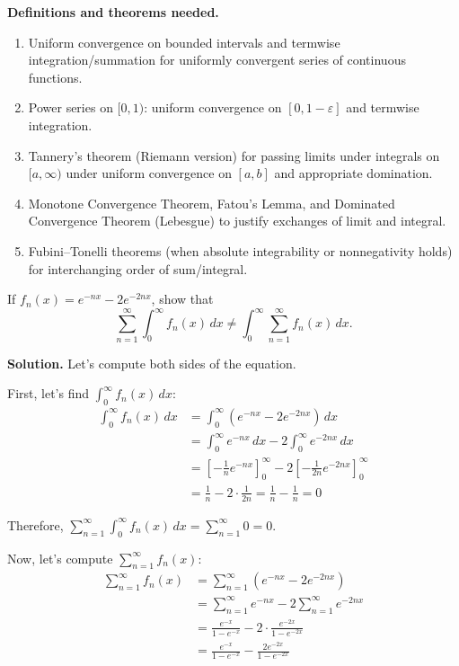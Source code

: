 \noindent\textbf{Definitions and theorems needed.}
\begin{enumerate}[label=(\alph*)]
    \item Uniform convergence on bounded intervals and termwise integration/summation for uniformly convergent series of continuous functions.
    \item Power series on $[0,1)$: uniform convergence on $[0,1-\varepsilon]$ and termwise integration.
    \item Tannery's theorem (Riemann version) for passing limits under integrals on $[a,\infty)$ under uniform convergence on $[a,b]$ and appropriate domination.
    \item Monotone Convergence Theorem, Fatou's Lemma, and Dominated Convergence Theorem (Lebesgue) to justify exchanges of limit and integral.
    \item Fubini–Tonelli theorems (when absolute integrability or nonnegativity holds) for interchanging order of sum/integral.
\end{enumerate}

\begin{problembox}
If $f_n(x) = e^{-nx} - 2e^{-2nx}$, show that 
\[\sum_{n=1}^{\infty} \int_{0}^{\infty} f_n(x) \, dx \neq \int_{0}^{\infty} \sum_{n=1}^{\infty} f_n(x) \, dx.\]
\end{problembox}

\noindent\textbf{Solution.}
Let's compute both sides of the equation.

First, let's find $\int_{0}^{\infty} f_n(x) \, dx$:
\begin{align*}
\int_{0}^{\infty} f_n(x) \, dx &= \int_{0}^{\infty} (e^{-nx} - 2e^{-2nx}) \, dx \\
&= \int_{0}^{\infty} e^{-nx} \, dx - 2\int_{0}^{\infty} e^{-2nx} \, dx \\
&= \left[-\frac{1}{n}e^{-nx}\right]_{0}^{\infty} - 2\left[-\frac{1}{2n}e^{-2nx}\right]_{0}^{\infty} \\
&= \frac{1}{n} - 2 \cdot \frac{1}{2n} = \frac{1}{n} - \frac{1}{n} = 0
\end{align*}

Therefore, $\sum_{n=1}^{\infty} \int_{0}^{\infty} f_n(x) \, dx = \sum_{n=1}^{\infty} 0 = 0$.

Now, let's compute $\sum_{n=1}^{\infty} f_n(x)$:
\begin{align*}
\sum_{n=1}^{\infty} f_n(x) &= \sum_{n=1}^{\infty} (e^{-nx} - 2e^{-2nx}) \\
&= \sum_{n=1}^{\infty} e^{-nx} - 2\sum_{n=1}^{\infty} e^{-2nx} \\
&= \frac{e^{-x}}{1 - e^{-x}} - 2 \cdot \frac{e^{-2x}}{1 - e^{-2x}} \\
&= \frac{e^{-x}}{1 - e^{-x}} - \frac{2e^{-2x}}{1 - e^{-2x}}
\end{align*}

